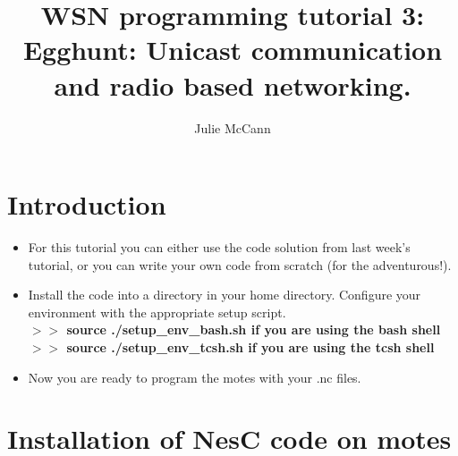 \documentclass [a4] {article}
\author{Julie McCann}
\title{WSN programming tutorial 3: Egghunt: Unicast communication and radio based networking.}
\begin{document}
\maketitle

\section{Introduction}

\begin{itemize}

\item For this tutorial you can either use the code solution from last week's tutorial, or you can write your own code from scratch (for the adventurous!). 

\item Install the code into a directory in your home directory. Configure your environment with the appropriate setup script. \\

\textbf{$>>$ source ./setup\_env\_bash.sh if you are using the bash shell}\\
\textbf{$>>$ source ./setup\_env\_tcsh.sh if you are using the tcsh shell}


\item Now you are ready to program the motes with your .nc files.

\end{itemize}

\section{Installation of NesC code on motes}
\end{document}
